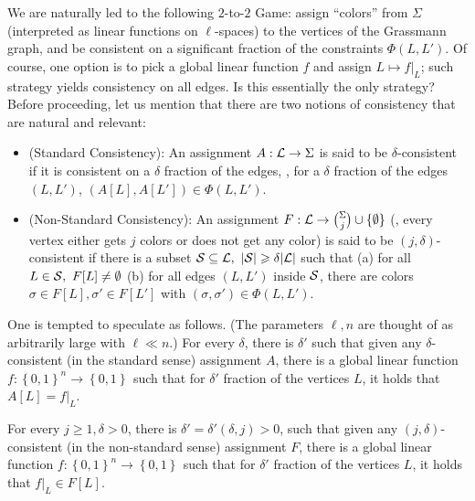 \documentclass{toc}
\newcommand\set[1]{{\left\{ #1 \right\}}}
\newcommand\power[1]{\set{0,1}^{#1}}
\renewcommand\geq{\geqslant}
\begin{document}
We are naturally led to the following $2$-to-$2$ Game: assign ``colors'' from $\Sigma$ (interpreted as linear functions on $\ell$-spaces) to the vertices
 of the Grassmann graph, and be consistent on a significant fraction of the
 constraints $\Phi(L,L')$.
 Of course, one option is to pick a global linear
 function $f$ and assign $L \mapsto f|_L$; such strategy yields consistency on all edges.
 Is this essentially the only strategy? Before proceeding, let us mention that
 there are two notions of consistency that are natural and relevant:
 \begin{itemize}
 \item (Standard Consistency): An assignment $A: {\cal L} \to \Sigma$ is said to be $\delta$-consistent if it is consistent on
 a %
 $\delta$ fraction of the
       edges, \ie, for
       a %
       $\delta$ fraction of the edges $(L, L')$, $(A[L], A[L']) \in \Phi(L, L')$.
 \item (Non-Standard Consistency): An assignment $F: {\cal L} \to {\Sigma \choose j} \cup \{\emptyset\}$ (\ie, every vertex either gets $j$ colors or
        does not get any color) is said to be $(j,\delta)$-consistent if there is a subset ${\cal S} \subseteq {\cal L}, ~|{\cal S}| \geq \delta |{\cal L}|$
        such that (a) for all $ L \in {\cal S}, ~F[L] \neq  \emptyset$ (b) for all edges $(L, L')$ inside ${\cal S}$, there are colors $\sigma\in F[L], \sigma'\in F[L']$
        with $(\sigma, \sigma') \in \Phi(L,L')$.
\end{itemize}

One is tempted to speculate %
%
%
as follows. (The parameters $\ell, n$ are thought of as arbitrarily
large with $\ell \ll n$.)  %
\medskip
{} For every $\delta$, there is $\delta'$ such that given any $\delta$-consistent (in the standard sense)
   assignment $A$, there is a global linear
function $f:\power{n} \to \power{}$ such that for $\delta'$ fraction of the vertices $L$, it holds that $A[L] = f|_L$.

\medskip
{} For every $j \geq 1, \delta > 0$, there is $\delta' = \delta'(\delta,j)>0$, such that given any $(j,\delta)$-consistent (in the non-standard sense)
assignment $F$, there is a global linear
function $f:\power{n} \to \power{}$ such that for $\delta'$ fraction of the vertices $L$, it holds that $f|_L \in F[L]$.
\end{document}
